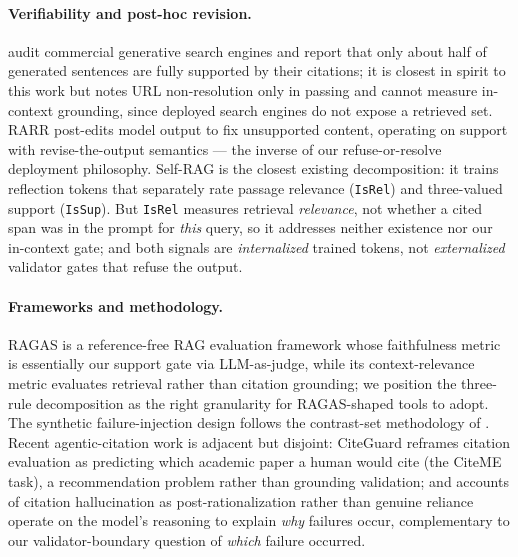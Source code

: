 \paragraph{Verifiability and post-hoc revision.}
\citet{liu2023verifiability} audit commercial generative search
engines and report that only about half of generated sentences are
fully supported by their citations; it is closest in spirit to this
work but notes URL non-resolution only in passing and cannot measure
in-context grounding, since deployed search engines do not expose a
retrieved set. RARR \citep{gao2023rarr} post-edits model output to fix
unsupported content, operating on support with revise-the-output
semantics --- the inverse of our refuse-or-resolve deployment
philosophy. Self-RAG \citep{asai2024selfrag} is the closest existing
decomposition: it trains reflection tokens that separately rate
passage relevance (\texttt{IsRel}) and three-valued support
(\texttt{IsSup}). But \texttt{IsRel} measures retrieval
\emph{relevance}, not whether a cited span was in the prompt for
\emph{this} query, so it addresses neither existence nor our
in-context gate; and both signals are \emph{internalized} trained
tokens, not \emph{externalized} validator gates that refuse the
output.

\paragraph{Frameworks and methodology.}
RAGAS \citep{es2024ragas} is a reference-free RAG evaluation framework
whose faithfulness metric is essentially our support gate via
LLM-as-judge, while its context-relevance metric evaluates retrieval
rather than citation grounding; we position the three-rule
decomposition as the right granularity for RAGAS-shaped tools to
adopt. The synthetic failure-injection design follows the contrast-set
methodology of \citet{gardner2020contrast}. Recent agentic-citation
work is adjacent but disjoint: CiteGuard \citep{choi2025citeguard}
reframes citation evaluation as predicting which academic paper a
human would cite (the CiteME task), a recommendation problem rather
than grounding validation; and accounts of citation hallucination as
post-rationalization rather than genuine reliance
\citep{wallat2024correctness} operate on the model's reasoning to
explain \emph{why} failures occur, complementary to our
validator-boundary question of \emph{which} failure occurred.

